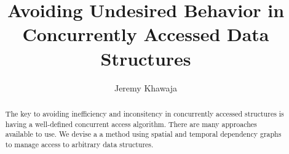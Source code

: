 \documentclass[english]{article}
\begin{document}
	
\hypersetup{
	colorlinks=true, %
	linktoc=all,     %
	linkcolor=blue,  %
}

\onecolumn
\title{Avoiding Undesired Behavior in Concurrently Accessed Data Structures}
\author{Jeremy Khawaja}
\maketitle

\begin{abstract}
		The key to avoiding inefficiency and inconsitency in concurrently accessed structures is having a well-defined concurrent access algorithm. There are many approaches available to use. We devise a a method using spatial and temporal dependency graphs to manage access to arbitrary data structures.
\end{abstract}
\twocolumn









\onecolumn
\end{document}
